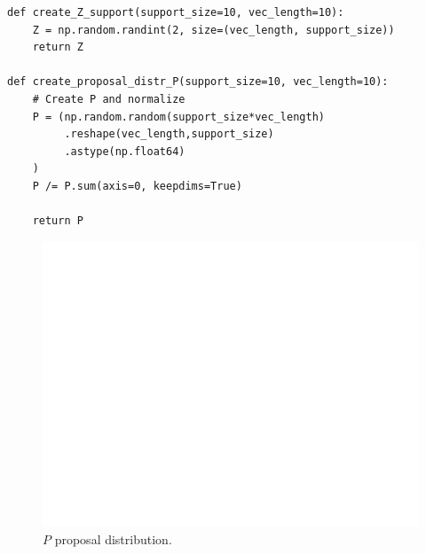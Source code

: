 
\begin{verbatim}
def create_Z_support(support_size=10, vec_length=10):
    Z = np.random.randint(2, size=(vec_length, support_size))
    return Z
    
def create_proposal_distr_P(support_size=10, vec_length=10):
    # Create P and normalize
    P = (np.random.random(support_size*vec_length)
         .reshape(vec_length,support_size)
         .astype(np.float64)
    )
    P /= P.sum(axis=0, keepdims=True) 
   
    return P
\end{verbatim}

\begin{figure}[H]
    \centering
    \includegraphics[width=0.5\linewidth]{data/05_reporting/problem_set_2/proposal_distribution.pdf}
    \caption{$P$ proposal distribution.}
    \label{fig:proposal-dist}
\end{figure}